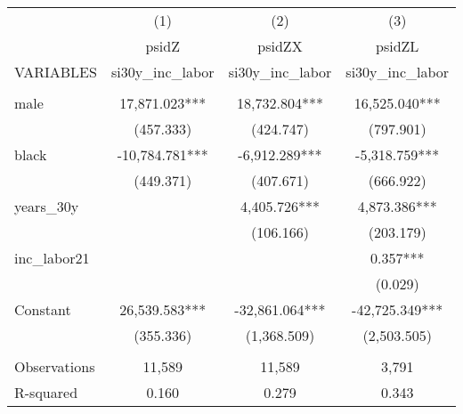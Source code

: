\begin{tabular}{lccc} \hline
 & (1) & (2) & (3) \\
 & psidZ & psidZX & psidZL \\
VARIABLES & si30y\_inc\_labor & si30y\_inc\_labor & si30y\_inc\_labor \\ \hline
 &  &  &  \\
male & 17,871.023*** & 18,732.804*** & 16,525.040*** \\
 & (457.333) & (424.747) & (797.901) \\
black & -10,784.781*** & -6,912.289*** & -5,318.759*** \\
 & (449.371) & (407.671) & (666.922) \\
years\_30y &  & 4,405.726*** & 4,873.386*** \\
 &  & (106.166) & (203.179) \\
inc\_labor21 &  &  & 0.357*** \\
 &  &  & (0.029) \\
Constant & 26,539.583*** & -32,861.064*** & -42,725.349*** \\
 & (355.336) & (1,368.509) & (2,503.505) \\
 &  &  &  \\
Observations & 11,589 & 11,589 & 3,791 \\
 R-squared & 0.160 & 0.279 & 0.343 \\ \hline
\end{tabular}
